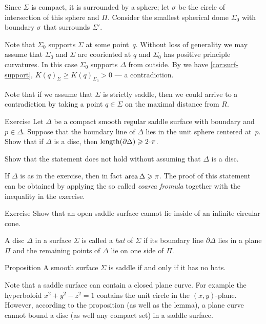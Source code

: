 Since $\Sigma$ is compact, it is surrounded by a sphere;
let $\sigma$ be the circle of intersection of this sphere and $\Pi$.
Consider the smallest spherical dome $\Sigma_0$ with boundary $\sigma$ that surrounds $\Sigma'$.

Note that $\Sigma_0$ supports $\Sigma$ at some point~$q$.
Without loss of generality we may assume that $\Sigma_0$ and $\Sigma$ are cooriented at $q$ and $\Sigma_0$ has positive principle curvatures.
In this case $\Sigma_0$ supports $\Delta$ from outside.
By we have \ref{cor:surf-support}, $K(q)_\Sigma\ge K(q)_{\Sigma_0}>0$ --- a contradiction.
\qeds

Note that if we assume that $\Sigma$ is strictly saddle, then we could arrive to a contradiction by taking a point $q\in \Sigma$ on the maximal distance from $R$.

\begin{thm}{Exercise}\label{ex:length-of-bry}
Let $\Delta$ be a compact smooth regular saddle surface with boundary and $p\in \Delta$.
Suppose that the boundary line of $\Delta$ lies in the unit sphere centered at~$p$.
Show that if $\Delta$ is a disc, then $\length (\partial \Delta)\ge 2\cdot\pi$.

Show that the statement does not hold without assuming that $\Delta$ is a disc.
\end{thm}

If $\Delta$ is as in the exercise, then in fact $\mathop{\rm area}\nolimits \Delta\geqslant \pi$.
The proof of this statement can be obtained by applying the so called \emph{coarea fromula} together with the inequality in the exercise. 

\begin{thm}{Exercise}\label{ex:circular-cone-saddle}
Show that an open saddle surface
cannot lie inside of an infinite circular cone. 
\end{thm}

A disc $\Delta$ in a surface $\Sigma$ is called a \emph{hat} of $\Sigma$
if its boundary line $\partial\Delta$ lies in a plane $\Pi$ and the remaining points of $\Delta$ lie on one side of $\Pi$.

\begin{thm}{Proposition}\label{prop:hat}
A smooth surface $\Sigma$ is saddle if and only if it has no hats.
\end{thm}

Note that a saddle surface can contain a closed plane curve.
For example the hyperboloid $x^2+y^2-z^2=1$ contains the unit circle in the $(x,y)$-plane.
However, according to the proposition (as well as the lemma), a plane curve cannot bound a disc (as well any compact set) in a saddle surface.

